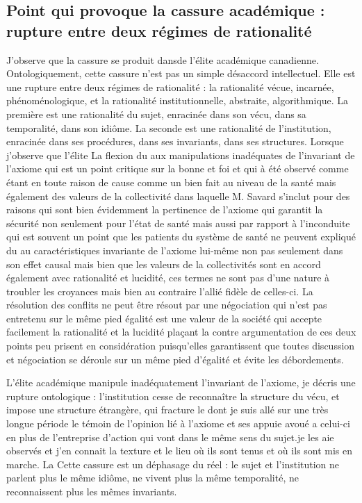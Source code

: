 \documentclass[12pt,a4paper]{article}
\begin{document}
\subsection*{Point qui provoque la cassure académique : rupture entre deux régimes de rationalité}
J’observe que la cassure se produit dansde l’élite académique canadienne. Ontologiquement, cette cassure n’est pas un simple désaccord intellectuel. Elle est une rupture entre deux régimes de rationalité :
	la rationalité vécue, incarnée, phénoménologique,
	et la rationalité institutionnelle, abstraite, algorithmique.
La première est une rationalité du sujet, enracinée dans son vécu, dans sa temporalité, dans son idiôme. La seconde est une rationalité de l’institution, enracinée dans ses procédures, dans ses invariants, dans ses structures.
Lorsque j’observe que l’élite
La flexion du aux manipulations inadéquates de l’invariant de l’axiome qui est un point critique sur la bonne et foi et qui à été observé comme étant en toute raison de cause comme un bien fait au niveau de la santé mais également des valeurs de la collectivité dans laquelle M. Savard s’inclut pour des raisons qui sont bien évidemment la pertinence de l’axiome qui garantit la sécurité non seulement pour l’état de santé mais aussi par rapport à l’inconduite qui est souvent un point que les patients du système de santé ne peuvent  expliqué du au caractéristiques invariante  de l’axiome lui-même non pas seulement dans son effet causal mais bien que les valeurs de la collectivités sont en accord également avec rationalité et lucidité, ces termes ne sont pas d’une nature à troubler les croyances mais bien au contraire l’allié fidèle de celles-ci. La résolution des conflits ne peut être résout par une négociation qui n’est pas entretenu sur le même pied égalité est une valeur de la société qui accepte facilement la rationalité et la lucidité plaçant la contre argumentation de ces deux points peu prisent en considération puisqu’elles garantissent que toutes discussion et négociation se déroule sur un même pied d’égalité et évite les débordements.

L’élite académique manipule inadéquatement l’invariant de l’axiome, je décris une rupture ontologique : l’institution cesse de reconnaître la structure du vécu, et impose une structure étrangère, qui fracture le dont je suis allé sur une très longue période le témoin de l’opinion lié à l’axiome et ses appuie avoué a celui-ci en plus de l’entreprise d’action qui vont dans le même sens du sujet.je les aie observés et j’en connait la texture et le lieu où ils sont tenus et où ils sont mis en marche. La
Cette cassure est un déphasage du réel : le sujet et l’institution ne parlent plus le même idiôme, ne vivent plus la même temporalité, ne reconnaissent plus les mêmes invariants.
\end{document}
